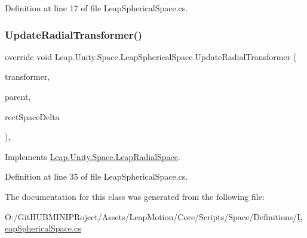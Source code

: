 Definition at line 17 of file Leap\+Spherical\+Space.\+cs.

\mbox{\label{class_leap_1_1_unity_1_1_space_1_1_leap_spherical_space_aaae3bed7e24ee9a7ccc564ff19888419}} 
\subsubsection{\texorpdfstring{UpdateRadialTransformer()}{UpdateRadialTransformer()}}
{\footnotesize\ttfamily override void Leap.\+Unity.\+Space.\+Leap\+Spherical\+Space.\+Update\+Radial\+Transformer (\begin{DoxyParamCaption}\item[{\mbox{\hyperlink{interface_leap_1_1_unity_1_1_space_1_1_i_transformer}{I\+Transformer}}}]{transformer,  }\item[{\mbox{\hyperlink{interface_leap_1_1_unity_1_1_space_1_1_i_transformer}{I\+Transformer}}}]{parent,  }\item[{Vector3}]{rect\+Space\+Delta }\end{DoxyParamCaption})\hspace{0.3cm}{\ttfamily [protected]}, {\ttfamily [virtual]}}



Implements \mbox{\hyperlink{class_leap_1_1_unity_1_1_space_1_1_leap_radial_space_afc597bb7c75791b2f8807b3b810e8c69}{Leap.\+Unity.\+Space.\+Leap\+Radial\+Space}}.



Definition at line 35 of file Leap\+Spherical\+Space.\+cs.



The documentation for this class was generated from the following file\+:\begin{DoxyCompactItemize}
\item 
O\+:/\+Git\+H\+U\+B\+M\+I\+N\+I\+P\+Roject/\+Assets/\+Leap\+Motion/\+Core/\+Scripts/\+Space/\+Definitions/\mbox{\hyperlink{_leap_spherical_space_8cs}{Leap\+Spherical\+Space.\+cs}}\end{DoxyCompactItemize}
